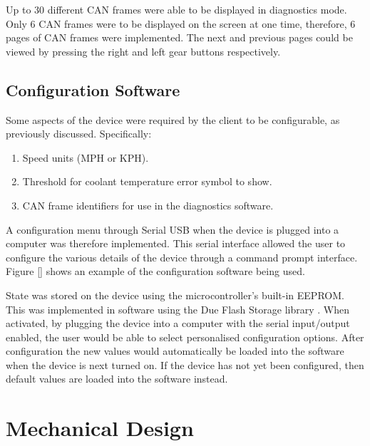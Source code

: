 \documentclass[a4paper,12pt]{article}
\begin{document}
Up to 30 different CAN frames were able to be displayed in diagnostics mode. Only 6 CAN frames were to be displayed on the screen at one time, therefore, 6 pages of CAN frames were implemented. The next and previous pages could be viewed by pressing the right and left gear buttons respectively.

\subsection{Configuration Software}
\label{sec:configuration_software}

Some aspects of the device were required by the client to be configurable, as previously discussed. Specifically:

\begin{enumerate}
  \item Speed units (MPH or KPH).
  \item Threshold for coolant temperature error symbol to show.
  \item CAN frame identifiers for use in the diagnostics software.
\end{enumerate}

A configuration menu through Serial USB when the device is plugged into a computer was therefore implemented. This serial interface allowed the user to configure the various details of the device through a command prompt interface. Figure \ref{} shows an example of the configuration software being used.

%

State was stored on the device using the microcontroller's built-in EEPROM. This was implemented in software using the Due Flash Storage library \cite{due_flash_storage}. When activated, by plugging the device into a computer with the serial input/output enabled, the user would be able to select personalised configuration options. After configuration the new values would automatically be loaded into the software when the device is next turned on. If the device has not yet been configured, then default values are loaded into the software instead.


\newpage
\section{Mechanical Design}
\label{sec:mechanical_design}
\end{document}
